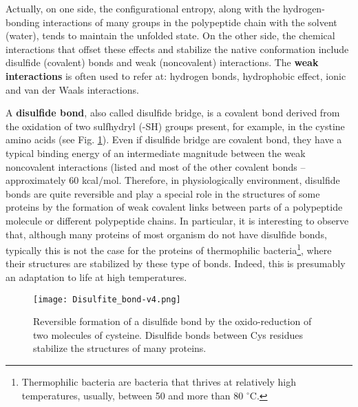 Actually, on one side, the configurational entropy, along with the hydrogen-bonding interactions of many groups in the polypeptide chain with the solvent (water), tends to maintain the unfolded state. On the other side, the chemical interactions that offset these effects and stabilize the native conformation include disulfide (covalent) bonds and weak (noncovalent) interactions. The \textbf{weak interactions} is often used to refer at: hydrogen bonds, hydrophobic effect, ionic and van der Waals interactions. 

A \textbf{disulfide bond}, also called disulfide bridge, is a covalent bond derived from the oxidation of two sulfhydryl (-SH) groups present, for example, in the cystine amino acids (see Fig. \ref{fig:ss-bond}). Even if disulfide bridge are covalent bond, they have a typical binding energy of an intermediate magnitude between the weak noncovalent interactions (listed  and most of the other covalent bonds -- approximately 60 kcal$/$mol. Therefore, in physiologically environment, disulfide bonds are quite reversible and play a special role in the structures of some proteins by the formation of weak covalent links between parts of a polypeptide molecule or different polypeptide chains. In particular, it is interesting to observe that, although many proteins of most organism do not have disulfide bonds, typically this is not the case for the proteins of thermophilic bacteria\footnote{Thermophilic bacteria are bacteria that thrives at relatively high temperatures, usually, between 50 and more than 80 $^\circ$C.}, where their structures are stabilized by these type of bonds. Indeed, this is presumably an adaptation to life at high temperatures. 

\begin{figure}[h]
\centering
\begin{minipage}[t]{0.8\textwidth}
\centering
\texttt{[image: Disulfite\_bond-v4.png]}

\caption{\small{Reversible formation of a disulfide bond by the oxido-reduction of two molecules of cysteine. Disulfide bonds between Cys residues stabilize the structures of many proteins.}}

\label{fig:ss-bond}
\end{minipage} 
\end{figure}

